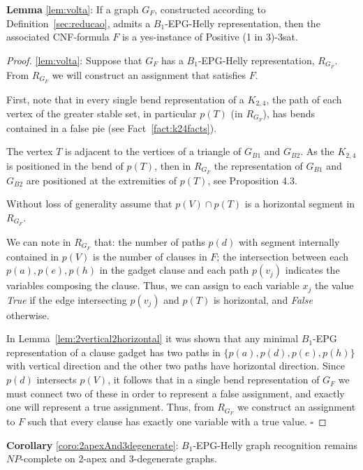 \documentclass[runningheads]{llncs}
\begin{document}
\begin{lemma*}\textbf{Lemma} \ref{lem:volta}:
If a graph $G_F$, constructed according to Definition~\ref{sec:reducao}, admits a $B_1$-EPG-Helly representation, then the associated CNF-formula $F$ is a yes-instance of {\sc Positive (1 in 3)-3sat}.
\end{lemma*}

\begin{proof}%
\ref{lem:volta}:
Suppose that $G_F$ has a $B_1$-EPG-Helly representation, $R_{G_F}$.  From $R_{G_F}$ we will construct an assignment that satisfies $F$. 

First, note that in every single bend representation of a $K_{2,4}$, the path of each vertex of the greater stable set, in particular $p(T)$ (in $R_{G_F}$), has bends contained in a false pie (see Fact~\ref{fact:k24facts}). 


The vertex $T$ is adjacent to the vertices of a triangle of $G_{B1}$ and $G_{B2}$. As the $K_{2,4}$ is positioned in the bend of $p(T)$, then in $R_{G_F}$ the representation of $G_{B1}$ and $G_{B2}$ are positioned at the extremities of $p(T)$, see Proposition 4.3. %


Without loss of generality assume that $p(V) \cap p(T)$ is a horizontal segment in $R_{G_F}$.

We can note in $R_{G_F}$ that: the number of paths $p(d)$ with segment internally contained in $p(V)$ is the number of clauses in $F$; the intersection between each $p(a), p(e), p(h)$ in the gadget clause and each path $p(v_j)$ indicates the variables composing the clause. Thus, we can assign to each variable $ x_{j}$ the value \textit{True} if the edge intersecting $p(v_j)$ and $p(T)$ is horizontal, and \textit{False} otherwise. 


In Lemma~\ref{lem:2vertical2horizontal} it was shown that any minimal $B_1$-EPG representation of a clause gadget has two paths in $\{p(a), p(d), p(e), p(h)\}$ with vertical direction and the other two paths have horizontal direction. Since $p(d)$ intersects $p(V)$, it follows that in a single bend representation of $G_F$ we must connect two of these in order to represent a false assignment, and exactly one will represent a true assignment. Thus, from $R_{G_F}$ we construct an assignment to $F$ such that every clause has exactly one variable with a true value.  
$\square$ \end{proof}

\begin{coro*}\textbf{Corollary} \ref{coro:2apexAnd3degenerate}:
{\sc $B_{1}$-EPG-Helly graph recognition} remains $NP$-complete on $2$-apex and $3$-degenerate graphs.
\end{coro*}
\end{document}
